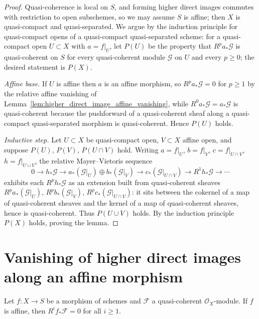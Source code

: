 \begin{proof}
  Quasi-coherence is local on \(S\), and forming higher direct images commutes
  with restriction to open subschemes, so we may assume \(S\) is affine; then
  \(X\) is quasi-compact and quasi-separated. We argue by the induction principle
  for quasi-compact opens of a quasi-compact quasi-separated scheme: for a
  quasi-compact open \(U \subset X\) with \(a = f|_U\), let \(P(U)\) be the
  property that \(R^p a_*\mathcal{G}\) is quasi-coherent on \(S\) for every
  quasi-coherent module \(\mathcal{G}\) on \(U\) and every \(p \geq 0\); the
  desired statement is \(P(X)\).

  \emph{Affine base.} If \(U\) is affine then \(a\) is an affine morphism, so
  \(R^p a_*\mathcal{G} = 0\) for \(p \geq 1\) by the relative affine vanishing of
  Lemma~\ref{lem:higher_direct_image_affine_vanishing}, while
  \(R^0 a_*\mathcal{G} = a_*\mathcal{G}\) is quasi-coherent because the pushforward
  of a quasi-coherent sheaf along a quasi-compact quasi-separated morphism is
  quasi-coherent. Hence \(P(U)\) holds.

  \emph{Inductive step.} Let \(U \subset X\) be quasi-compact open, \(V \subset X\)
  affine open, and suppose \(P(U)\), \(P(V)\), \(P(U \cap V)\) hold. Writing
  \(a = f|_U\), \(b = f|_V\), \(c = f|_{U \cap V}\), \(h = f|_{U \cup V}\), the
  relative Mayer--Vietoris sequence
  \[
    0 \to h_*\mathcal{G} \to a_*(\mathcal{G}|_U) \oplus b_*(\mathcal{G}|_V)
      \to c_*(\mathcal{G}|_{U \cap V}) \to R^1 h_*\mathcal{G} \to \cdots
  \]
  exhibits each \(R^p h_*\mathcal{G}\) as an extension built from quasi-coherent
  sheaves \(R^p a_*(\mathcal{G}|_U)\), \(R^p b_*(\mathcal{G}|_V)\),
  \(R^p c_*(\mathcal{G}|_{U \cap V})\): it sits between the cokernel of a map of
  quasi-coherent sheaves and the kernel of a map of quasi-coherent sheaves, hence
  is quasi-coherent. Thus \(P(U \cup V)\) holds. By the induction principle
  \(P(X)\) holds, proving the lemma.
\end{proof}

\section{Vanishing of higher direct images along an affine morphism}

\begin{lemma}
  \label{lem:higher_direct_image_affine_vanishing}
  Let \(f : X \to S\) be a morphism of schemes and \(\mathcal{F}\) a
  quasi-coherent \(\mathcal{O}_X\)-module. If \(f\) is affine, then
  \(R^i f_*\mathcal{F} = 0\) for all \(i \geq 1\).
\end{lemma}

